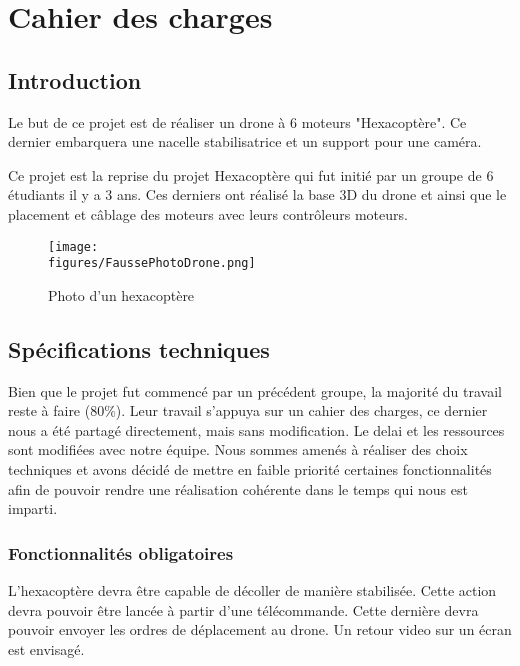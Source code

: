\chapter{Cahier des charges}
\label{chapter1}



\section{Introduction}

Le but de ce projet est de réaliser un drone à 6 moteurs "Hexacoptère".  Ce dernier embarquera une nacelle stabilisatrice et un support pour une caméra.

\vspace{1cm}
Ce projet est la reprise du projet Hexacoptère qui fut initié par un groupe de 6 étudiants il y a 3 ans.  Ces derniers ont réalisé la base 3D du drone et ainsi que le placement et câblage des moteurs avec leurs contrôleurs moteurs.

\begin{figure}[H]
	\centering
    \texttt{[image: \\figures/FaussePhotoDrone.png]}
    \decoRule
    \caption[
    Photo d'un hexacoptère]{
    Photo d'un hexacoptère}
    \label{fig:Photo d'un hexacoptère   }
	\end{figure}


\section{Spécifications techniques}

Bien que le projet fut commencé par un précédent groupe, la majorité du travail reste à faire (80\%). Leur travail s'appuya sur un cahier des charges, ce dernier nous a été partagé directement, mais sans modification. Le delai et les ressources sont modifiées avec notre équipe.
Nous sommes amenés à réaliser des choix techniques et avons décidé de mettre en faible priorité certaines fonctionnalités afin de pouvoir rendre une réalisation cohérente dans le temps qui nous est imparti.

\subsection{Fonctionnalités obligatoires}

L'hexacoptère devra être capable de décoller de manière stabilisée. Cette action devra pouvoir être lancée à partir d'une télécommande. \newline
Cette dernière devra pouvoir envoyer les ordres de déplacement au drone.  Un retour video sur un écran est envisagé.

